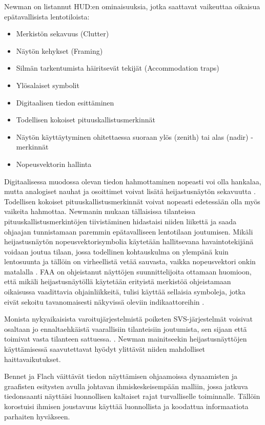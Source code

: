 \documentclass[utf8,bachelor,manualbib]{gradu3}
\begin{document}
Newman \citeyearpar{newman2000} on listannut HUD:en ominaisuuksia, jotka saattavat vaikeuttaa oikaisua epätavallisista lentotiloista:

\begin{itemize}
\item Merkistön sekavuus (Clutter)
\item Näytön kehykset (Framing)
\item Silmän tarkentumista häiritsevät tekijät (Accommodation traps)
\item Ylösalaiset symbolit
\item Digitaalisen tiedon esittäminen
\item Todellisen kokoiset pituuskallistusmerkinnät
\item Näytön käyttäytyminen ohitettaessa suoraan ylös (zenith) tai alas (nadir) -merkinnät
\item Nopeusvektorin hallinta
\end{itemize} 

Digitaalisessa muodossa olevan tiedon hahmottaminen nopeasti voi olla hankalaa, mutta analogiset nauhat ja osoittimet voivat lisätä heijastusnäytön sekavuutta \citeyearpar{zuschlag2003}. Todellisen kokoiset pituuskallistusmerkinnät voivat nopeasti edetessään olla myös vaikeita hahmottaa. Newmanin \citeyearpar{newman1995} mukaan tällaisissa tilanteissa pituuskallistusmerkintöjen tiivistäminen hidastaisi niiden liikettä ja saada ohjaajan tunnistamaan paremmin epätavalliseen lentotilaan joutumisen. Mikäli heijastusnäytön nopeusvektorisymbolia käytetään hallitsevana havaintotekijänä voidaan joutua tilaan, jossa todellinen kohtauskulma on ylempänä kuin lentosuunta ja tällöin on virheellistä vetää sauvasta, vaikka nopeusvektori onkin matalalla \citep{crawfordneal2006}. FAA on ohjeistanut näyttöjen suunnittelijoita ottamaan huomioon, että mikäli heijastusnäytöllä käytetään erityistä merkistöä ohjeistamaan oikaisussa vaadittavia ohjainliikkeitä, tulisi käyttää sellaisia symboleja, jotka eivät sekoitu tavanomaisesti näkyvissä oleviin indikaattoreihin \citep{crawfordneal2006}.

Monista nykyaikaisista varoitujärjestelmistä poiketen SVS-järjestelmät voisivat osaltaan jo ennaltaehkäistä vaarallisiin tilanteisiin joutumista, sen sijaan että toimivat vasta tilanteen sattuessa. \citep{schnellym2004}. Newman \citeyearpar{newman2000} mainitseekin heijastusnäyttöjen käyttämisessä saavutettavat hyödyt ylittävät niiden mahdolliset haittavaikutukset.

Bennet ja Flach \citeyearpar{bennetflach1994} väittävät tiedon näyttämisen ohjaamoissa dynaamisten ja graafisten esitysten avulla johtavan ihmiskeskeisempään malliin, jossa jatkuva tiedonsaanti näyttäisi luonnollisen kaltaiset rajat turvalliselle toiminnalle. Tällöin korostuisi ihmisen joustavuus käyttää luonnollista ja koodattua informaatiota parhaiten hyväkseen.
\end{document}
